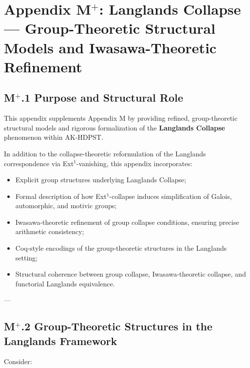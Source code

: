 \documentclass[11pt]{article}
\begin{document}

\section*{Appendix M$^{+}$: Langlands Collapse — Group-Theoretic Structural Models and Iwasawa-Theoretic Refinement}

\subsection*{M$^{+}$.1 Purpose and Structural Role}

This appendix supplements Appendix M by providing refined, group-theoretic structural models and rigorous formalization of the \textbf{Langlands Collapse} phenomenon within AK-HDPST.

In addition to the collapse-theoretic reformulation of the Langlands correspondence via Ext$^1$-vanishing, this appendix incorporates:

\begin{itemize}
    \item Explicit group structures underlying Langlands Collapse;
    \item Formal description of how Ext$^1$-collapse induces simplification of Galois, automorphic, and motivic groups;
    \item Iwasawa-theoretic refinement of group collapse conditions, ensuring precise arithmetic consistency;
    \item Coq-style encodings of the group-theoretic structures in the Langlands setting;
    \item Structural coherence between group collapse, Iwasawa-theoretic collapse, and functorial Langlands equivalence.
\end{itemize}

---

\subsection*{M$^{+}$.2 Group-Theoretic Structures in the Langlands Framework}

Consider:
\end{document}
